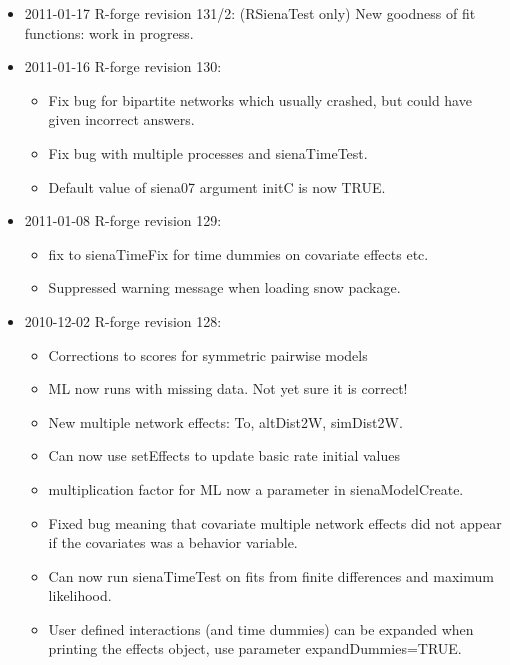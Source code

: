 \documentclass[a4paper,fleqn,11pt]{article}
\newcommand{\+}{\, + \,}
\begin{document}
{\begin{small}
\begin{itemize}
\begin{itemize}
\item Bug fix in iwlsm
\item sienaDataCreateFromSession, sienaTimeTest: improved error messages.
\item ML support for bipartite networks (still work in progress,
  particularly for missing data)
\end{itemize}
\item 2011-01-17 R-forge revision 131/2: (RSienaTest only)
New goodness of fit functions: work in progress.
\item 2011-01-16 R-forge revision 130:
\begin{itemize}
\item Fix bug for bipartite networks which usually crashed, but could have given
  incorrect answers.
\item Fix bug with multiple processes and sienaTimeTest.
\item Default value of siena07 argument initC is now TRUE.
\end{itemize}
\item 2011-01-08  R-forge revision 129:
\begin{itemize}
\item fix to sienaTimeFix for time dummies on
  covariate effects etc.
\item Suppressed warning message when loading snow package.
\end{itemize}
\item 2010-12-02 R-forge revision 128:
\begin{itemize}
\item Corrections to scores for symmetric pairwise models
\item ML now runs with missing data. Not yet sure it is correct!
\item New multiple network effects: To, altDist2W, simDist2W.
\item Can now use setEffects to update basic rate initial values
\item multiplication factor for ML now a parameter in sienaModelCreate.
\item Fixed bug meaning that covariate multiple network effects did not appear
  if the covariates was a behavior variable.
\item Can now run sienaTimeTest on fits from finite differences and maximum
  likelihood.
\item User defined interactions (and time dummies) can be expanded
  when printing
  the effects object, use parameter expandDummies=TRUE.
\end{itemize}

\end{itemize}
\end{small}}
\end{document}
